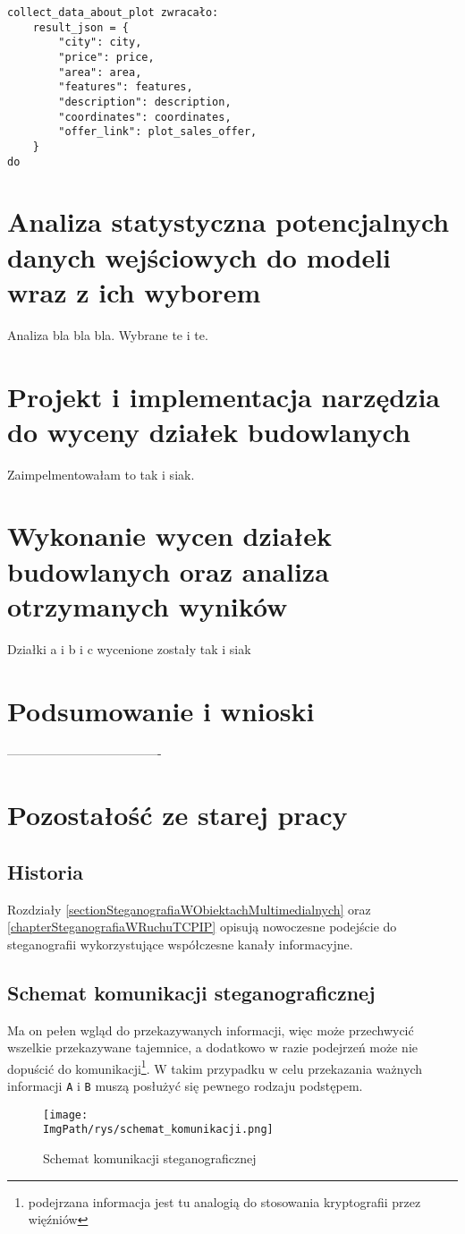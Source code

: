 \documentclass[a4paper,12pt,twoside,openany]{report}
\newcommand{\ImgPath}{.}
\newcommand{\tech}{\texttt}
\begin{document}
\begin{verbatim}
collect_data_about_plot zwracało:
    result_json = {
        "city": city,
        "price": price,
        "area": area,
        "features": features,
        "description": description,
        "coordinates": coordinates,
        "offer_link": plot_sales_offer,
    }
do 
\end{verbatim}



\chapter{Analiza statystyczna potencjalnych danych wejściowych do modeli wraz z ich wyborem}
Analiza bla bla bla.
Wybrane te i te.
\chapter{Projekt i implementacja narzędzia do wyceny działek budowlanych}
Zaimpelmentowałam to tak i siak.
\chapter{Wykonanie wycen działek budowlanych oraz analiza otrzymanych wyników}
Działki a i b i c wycenione zostały tak i siak
\chapter{Podsumowanie i wnioski}

-------------------------------------
\chapter{Pozostałość ze starej pracy}

\section{Historia}

Rozdziały \ref{sectionSteganografiaWObiektachMultimedialnych} oraz 
\ref{chapterSteganografiaWRuchuTCPIP} opisują nowoczesne podejście do 
steganografii wykorzystujące współczesne kanały informacyjne. 
\section{Schemat komunikacji steganograficznej}
\label{sectionSchematKomunikacjiSteganograficznej}
 Ma on pełen wgląd do przekazywanych 
informacji, więc może przechwycić wszelkie przekazywane tajemnice, a dodatkowo w 
razie podejrzeń może nie dopuścić do komunikacji\footnote{podejrzana informacja 
jest tu analogią do stosowania kryptografii przez więźniów}. W takim przypadku w 
celu przekazania ważnych informacji \tech{A} i \tech{B} muszą posłużyć się 
pewnego rodzaju podstępem. 
\begin{figure}[!htbp]
	\begin{center}
\centering
\texttt{[image: \\ImgPath/rys/schemat\_komunikacji.png]}
\end{center}
	\caption{Schemat komunikacji steganograficznej}
	\label{schematKomunikacji}
\end{figure}
\end{document}
